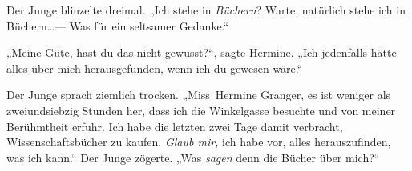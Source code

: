 Der Junge blinzelte dreimal. „Ich stehe in \emph{Büchern}? Warte, natürlich stehe ich in Büchern…— Was für ein seltsamer Gedanke.“

„Meine Güte, hast du das nicht gewusst?“, sagte Hermine. „Ich jedenfalls hätte alles über mich herausgefunden, wenn ich du gewesen wäre.“

Der Junge sprach ziemlich trocken. „Miss~Hermine Granger, es ist weniger als zweiundsiebzig Stunden her, dass ich die Winkelgasse besuchte und von meiner Berühmtheit erfuhr. Ich habe die letzten zwei Tage damit verbracht, Wissenschaftsbücher zu kaufen. \emph{Glaub mir,} ich habe vor, alles herauszufinden, was ich kann.“ Der Junge zögerte. „Was \emph{sagen} denn die Bücher über mich?“

